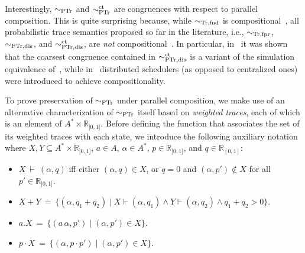 \documentclass{LMCS}
\newcommand{\realns}
	{\mathbb{R}}
\newcommand{\sbis}[1]
	{\sim_{#1}}
\begin{document}
Interestingly, $\sbis{\rm PTr}$ and $\sbis{\rm PTr}^{\rm ct}$ are congruences with respect to parallel
composition. This is quite surprising because, while $\sbis{\rm Tr,fnd}$ is compositional~\cite{BHR84}, all
probabilistic trace semantics proposed so far in the literature, i.e., $\sbis{\rm Tr,fpr}$, $\sbis{\rm
PTr,dis}$, and $\sbis{\rm PTr,dis}^{\rm ct}$, are \emph{not} compositional~\cite{JS90,Seg95b}. In
particular, in~\cite{LSV03} it was shown that the coarsest congruence contained in $\sbis{\rm PTr,dis}^{\rm
ct}$ is a variant of the simulation equivalence of~\cite{SL94}, while in~\cite{CLSV06} distributed
schedulers (as opposed to centralized ones) were introduced to achieve compositionality.

To prove preservation of $\sbis{\rm PTr}$ under parallel composition, we make use of an alternative
characterization of $\sbis{\rm PTr}$ itself based on \emph{weighted traces}, each of which is an element of
$A^{*} \times \realns_{]0, 1]}$. Before defining the function that associates the set of its weighted traces
with each state, we introduce the following auxiliary notation where $X, Y \subseteq A^{*} \times
\realns_{]0, 1]}$, $a \in A$, $\alpha \in A^{*}$, $p \in \realns_{]0, 1]}$, and $q \in \realns_{[0, 1]}$:

	\begin{itemize}

\item $X \: \vdash \: (\alpha, q)$ iff either $(\alpha, q) \in X$, or $q = 0$ and $(\alpha, p') \notin X$
for all $p' \in \realns_{]0, 1]}$.

\item $X + Y \: = \: \{ (\alpha, q_1 + q_2) \mid X \vdash (\alpha, q_1) \land Y \vdash (\alpha, q_2) \land
q_1 + q_2 > 0 \}$.

\item $a.X \: = \: \{ (a \, \alpha, p') \mid (\alpha, p') \in X \}$.

\item $p \cdot X \: = \: \{ (\alpha, p \cdot p') \mid (\alpha, p') \in X \}$.

	\end{itemize}
\end{document}
